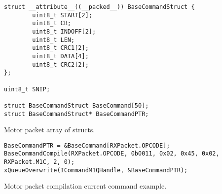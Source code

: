 \begin{listing}[ht]
\begin{verbatim}
struct __attribute__((__packed__)) BaseCommandStruct {
        uint8_t START[2];
        uint8_t CB;
        uint8_t INDOFF[2];
        uint8_t LEN;
        uint8_t CRC1[2];
        uint8_t DATA[4];
        uint8_t CRC2[2];
};

uint8_t SNIP;

struct BaseCommandStruct BaseCommand[50];
struct BaseCommandStruct* BaseCommandPTR;
\end{verbatim}
\caption{Motor packet array of structs.}
\label{listing:Motor packet array of structs}
\end{listing}

\begin{listing}[ht]
\begin{verbatim}
BaseCommandPTR = &BaseCommand[RXPacket.OPCODE];
BaseCommandCompile(RXPacket.OPCODE, 0b0011, 0x02, 0x45, 0x02,
RXPacket.M1C, 2, 0);
xQueueOverwrite(ICommandM1QHandle, &BaseCommandPTR);
\end{verbatim}
\caption{Motor packet compilation current command example.}
\label{listing:Motor packet compilation example}
\end{listing}